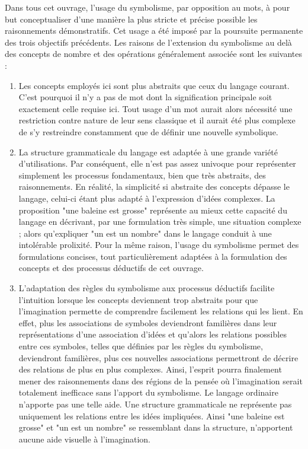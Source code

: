 \documentclass[a4paper]{book}
\begin{document}
Dans tous cet ouvrage, l'usage du symbolisme, par opposition au mots, à pour but conceptualiser d'une manière la plus stricte et précise possible les raisonnements démonstratifs. Cet usage a été imposé par la poursuite permanente des trois objectifs précédents. Les raisons de l'extension du symbolisme au delà des concepts de nombre et des opérations généralement associée sont les suivantes :
\begin{enumerate}
\item Les concepts employés ici sont plus abstraits que ceux du langage courant. C'est pourquoi il n'y a pas de mot dont la signification principale soit exactement celle requise ici. Tout usage d'un mot aurait alors nécessité une restriction contre nature de leur sens classique et il aurait été plus complexe de s'y restreindre constamment que de définir une nouvelle symbolique.
\item La structure grammaticale du langage est adaptée à une grande variété d'utilisations. Par conséquent, elle n'est pas assez univoque pour représenter simplement les processus fondamentaux, bien que très abstraits, des raisonnements. En réalité, la simplicité si abstraite des concepts dépasse le langage, celui-ci étant plus adapté à l'expression d'idées complexes. La proposition "une baleine est grosse" représente au mieux cette capacité du langage en décrivant, par une formulation très simple, une situation complexe ; alors qu'expliquer "un est un nombre" dans le langage conduit à une intolérable prolixité. Pour la même raison, l'usage du symbolisme permet des formulations concises, tout particulièrement adaptées à la formulation des concepts et des processus déductifs de cet ouvrage.
\item L'adaptation des règles du symbolisme aux processus déductifs facilite l'intuition lorsque les concepts deviennent trop abstraits pour que l'imagination permette de comprendre facilement les relations qui les lient. En effet, plus les associations de symboles deviendront familières dans leur représentations d'une association d'idées et qu'alors les relations possibles entre ces symboles, telles que définies par les règles du symbolisme, deviendront familières, plus ces nouvelles associations permettront de décrire des relations de plus en plus complexes. Ainsi, l'esprit pourra finalement mener des raisonnements dans des régions de la pensée où l'imagination serait totalement inefficace sans l'apport du symbolisme. Le langage ordinaire n'apporte pas une telle aide. Une structure grammaticale ne représente pas uniquement les relations entre les idées impliquées. Ainsi "une baleine est grosse" et "un est un nombre" se ressemblant dans la structure, n'apportent aucune aide visuelle à l'imagination.

\end{enumerate}
\end{document}
